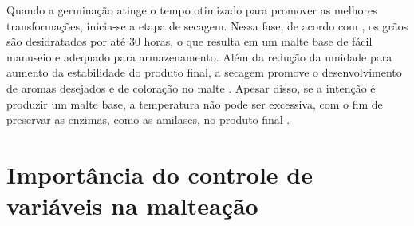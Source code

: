 Quando a germinação atinge o tempo otimizado para promover as melhores transformações, inicia-se a etapa de 
secagem. Nessa fase, de acordo com , os grãos são desidratados por até 
30 horas, o que resulta em um malte base de fácil manuseio e adequado para armazenamento. Além da redução da 
umidade para aumento da estabilidade do produto final, a secagem promove o desenvolvimento de aromas desejados 
e de coloração no malte \cite{BAMFORTH2003}. Apesar disso, se a intenção é produzir um malte base, a temperatura não 
pode ser excessiva, com o fim de preservar as enzimas, como as amilases, no produto final \cite{LEWIS2012}.


\section{Importância do controle de variáveis na malteação}